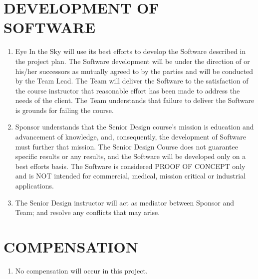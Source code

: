 \section{DEVELOPMENT OF SOFTWARE }
\begin{enumerate}  \itemsep4pt \parskip0pt 
\item  Eye In the Sky will use its best efforts to develop the Software described in the project plan. The Software development will be under the direction of  or his/her successors as mutually agreed to by the parties and will be conducted by the Team Lead.  The Team will deliver the Software to the satisfaction of the course instructor that reasonable effort has been made to address the needs of the client.  The Team understands that failure to deliver the Software is grounds for failing the course. 

\item  Sponsor understands that the Senior Design course's mission is education and advancement of knowledge, and, consequently, the development of Software must further that mission. The Senior Design Course does not guarantee specific results or any results, and the Software will be developed only on a best efforts basis.  The Software is considered PROOF OF CONCEPT only and is NOT intended for commercial, medical, mission critical or industrial applications.

\item  The Senior Design instructor will act as mediator between Sponsor and Team; and resolve any conflicts that may arise.
\end{enumerate}

\section{COMPENSATION}
\begin{enumerate}  \itemsep4pt \parskip0pt 
\item[] No compensation will occur in this project.
\end{enumerate}

